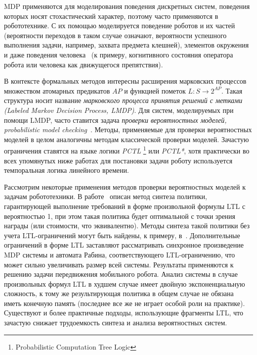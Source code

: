 \documentclass[a4, 14pt]{article}
\begin{document}
MDP применяются для моделирования поведения дискретных систем, поведения которых 
носят стохастический характер, поэтому часто применяются в робототехнике. 
С их помощью моделируется поведение роботов и их частей (вероятности 
переходов в таком случае означают, вероятности успешного выполнения задачи, 
например, захвата предмета клешней), элементов окружения и даже 
поведения человека~\cite{pentland1999modeling, rothkopf2013modular, mcghan2015human} 
(к примеру, когнитивного состояния оператора робота или человека как движущегося 
препятствия).

В контексте формальных методов интересны расширения марковских процессов 
множеством атомарных предикатов $AP$ и функцией пометок $L: S\rightarrow{}2^{AP}$. 
Такая структура носит название \textit{марковского процесса принятия решений с 
метками (Labeled Markov Decision Process, LMDP)}. Для систем, моделируемых при помощи 
LMDP, часто ставится задача \textit{проверки вероятностных моделей, 
probabilistic model checking}~\cite{baier2008principles}. Методы, применяемые для
проверки вероятностных моделей в целом аналогичны методам классической проверки 
моделей. Зачастую ограничения ставятся на языке логики \textit{PCTL}
\footnote{Probabilistic Computation Tree Logic} или \textit{PCTL*}, хотя 
практически во всех упомянутых ниже работах для постановки задачи роботу используется
темпоральная логика линейного времени.

Рассмотрим некоторые применения методов проверки вероятностных моделей к задачам робототехники.
В работе~\cite{svorenova2013optimal} описан метод синтеза политики, 
гарантирующей выполнение требований в форме произвольной формулы LTL с вероятностью 1, при этом 
такая политика будет оптимальной с точки зрения награды (или стоимости, что эквивалентно). Методы 
синтеза такой политики без учета LTL-ограничений могут быть найдены, к примеру, в~\cite{bertsekas1995dynamic}.
Дополнительные ограничений в форме LTL заставляют рассматривать синхронное произведение MDP системы и
автомата Рабина, соответствующего LTL-ограничению, что может сильно увеличивать размер всей системы.
Результаты применяются к решению задачи передвижения мобильного робота. Анализ системы в случае
произвольных формул LTL в худшем случае имеет двойную экспоненциальную сложность, к тому же результирующая
политика в общем случае не обязана иметь конечную память (последнее все же не играет особой роли на практике).
Существуют и более практичные подходы, использующие фрагменты LTL, что зачастую снижает трудоемкость
синтеза и анализа вероятностных систем.
\end{document}
